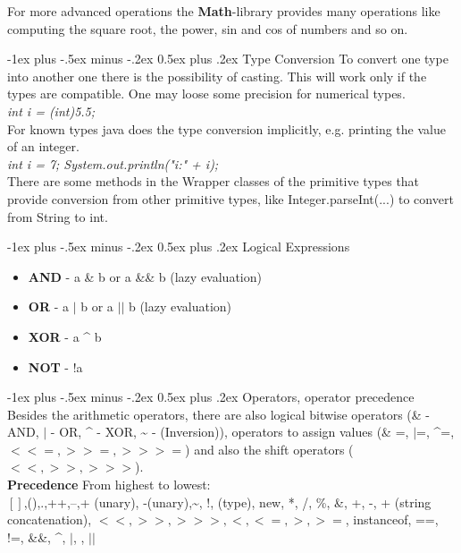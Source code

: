 \documentclass[10pt,landscape]{article}
\makeatletter
\renewcommand{\section}{\@startsection{section}{1}{0mm}%
                                {-1ex plus -.5ex minus -.2ex}%
                                {0.5ex plus .2ex}%
                                {\normalfont\large\bfseries}}
\makeatother
\begin{document}
\begin{multicols}{3}
For more advanced operations the \textbf{Math}-library provides many operations like computing the square root, the power, sin and cos of numbers and so on. 

\section{Type Conversion}
To convert one type into another one there is the possibility of casting. This will work only if the types are compatible. One may loose some precision for numerical types.\\
\emph{int i = (int)5.5;}\\
For known types java does the type conversion implicitly, e.g. printing the value of an integer.\\
\emph{int i = 7; System.out.println("i:" + i);}\\
There are some methods in the Wrapper classes of the primitive types that provide conversion from other primitive types, like Integer.parseInt(...) to convert from String to int.

\section{Logical Expressions}
\begin{itemize}
\item \textbf{AND} - a \& b or a \&\& b (lazy evaluation)
\item \textbf{OR} - a $\vert$ b or a $\vert\vert$ b (lazy evaluation)
\item \textbf{XOR} - a \^{ } b
\item \textbf{NOT} - !a
\end{itemize}


\section{Operators, operator precedence}
Besides the arithmetic operators, there are also logical bitwise operators (\& - AND, $\vert$ - OR, \^{ } - XOR, \~{ } - (Inversion)), operators to assign values (\& =, $\vert$=, \^{ }=, $<< =, >> =, >>>=$) and also the shift operators ($<<, >>, >>>$).\\
\textbf{Precedence} From highest to lowest:\\
$[]$,(),.,++,--,+ (unary), -(unary),\~{ }, !, (type), new, *, /, \%, \&, +, -, + (string concatenation), $<<, >>, >>>, <, <=, >, >=$, instanceof, ==, !=, \&\&, \^{ }, $\vert$, , $\vert\vert$  



\end{multicols}
\end{document}
